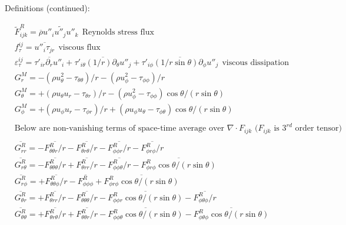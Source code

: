 \documentclass[10pt,paper=a4]{report}
\newcommand{\eht}{\overline}
\newcommand{\fht}{\widetilde}
\begin{document}
\begin{table*}
\label{tab:rans-cont}
\caption{Definitions (continued):}
\begin{align}                                                      
  & \fht{F}_{i j k}^R = \eht{\rho} \fht{u''_i u''_j u''_k}  \ \ \mbox{Reynolds stress flux} & &  \nonumber \\
  & f_\tau^{i j} = \eht{u''_i \tau_{j r}} \ \ \mbox{viscous flux}  & & \nonumber \\
  & \varepsilon_\tau^{ij} = \eht{\tau'_{ir} \partial_r u''_i} + \eht{\tau'_{i \theta} (1/r)\partial_\theta u''_j} + \eht{\tau'_{i \phi} (1/ r \sin{\theta}) \partial_\phi u''_j} \ \ \mbox{viscous dissipation} \nonumber \\
  & G_r^M = -(\rho u_{\theta}^{2} - \tau_{\theta\theta})/r - (\rho u_{\phi}^{2} - \tau_{\phi\phi})/r  & &  \nonumber \\
  & G_\theta^M = +(\rho u_{\theta} u_{r} - \tau_{\theta r})/r - (\rho u_{\phi}^{2} - \tau_{\phi\phi}) \cos{\theta}/(r \sin{\theta})  & & \nonumber \\
  & G_\phi^M = +(\rho u_{\phi} u_{r} - \tau_{\phi r})/r + (\rho u_{\phi} u_{\theta} - \tau_{\phi \theta})\cos{\theta}/(r \sin{\theta})   & & \nonumber \\
  & & & \nonumber \\
  & \mbox{Below are non-vanishing terms of space-time average over $\nabla \cdot F_{ijk}$ ($F_{ijk}$ is $3^{rd}$ order tensor)} & & \nonumber \\
  & & & \nonumber \\  
  & \eht{G_{rr}^R} =  -\eht{F^R_{\theta\theta r}/r} - \eht{F^R_{\theta r \theta}/r} - \eht{F^R_{\phi\phi r}/r} - \eht{F^R_{\phi r \phi}/r} \ & & \nonumber \\ 
  & \eht{G_{r\theta}^R} = - \eht{F^R_{\theta \theta \theta}/r} + \eht{F^R_{\theta rr}/r} - \eht{F^R_{\phi \phi \theta}/r} - \eht{F^R_{\phi r \phi} \cos{\theta}/(r\sin{\theta})}   & & \nonumber \\
  & \eht{G_{r\phi}^R} = + \eht{F^R_{\theta \theta \phi}/r} - \eht{F^R_{\phi \phi \phi}} + \eht{F^R_{\phi r \phi} \cos{\theta}/(r\sin{\theta})}  & & \nonumber \\  
  & \eht{G_{\theta r}^R} = + \eht{F^R_{\theta rr}/r} - \eht{F^R_{\theta \theta \theta}/r} -\eht{F^R_{\phi \phi r} \cos{\theta}/(r \sin{\theta})} - \eht{F^R_{\phi \theta \phi}/r}  & & \nonumber \\
  & \eht{G_{\theta \theta}^R} =  +\eht{F^R_{\theta r \theta}/r} + \eht{F^R_{\theta \theta r}/r} - \eht{F^R_{\phi \phi \theta} \cos{\theta}/(r\sin{\theta})} - \eht{F^R_{\phi \theta \phi} \cos{\theta}/(r\sin{\theta})}  & & \nonumber \\

\end{align}
\end{table*}
\end{document}
